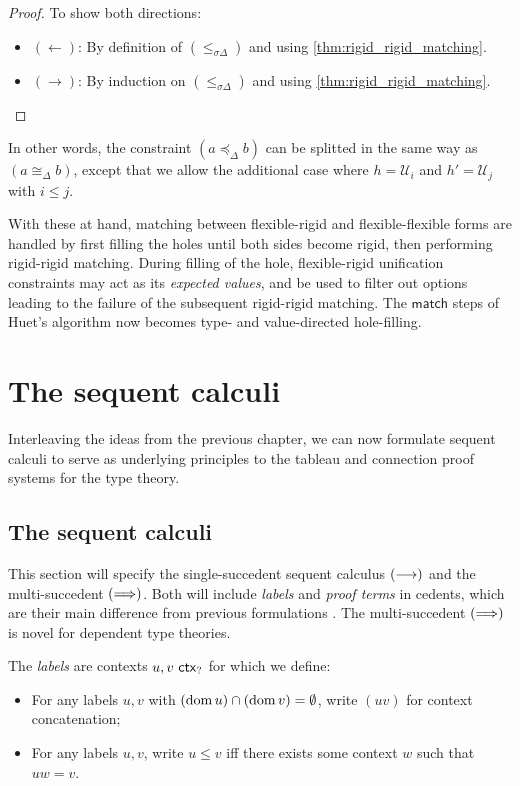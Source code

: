 \documentclass[twoside]{report}
\begin{document}
\begin{proof}
    To show both directions:
    \begin{itemize}[noitemsep]
        \item $(\leftarrow)$: By definition of $(\leq_{\sigma \Delta})$ and using \cref{thm:rigid_rigid_matching}.
        \item $(\rightarrow)$: By induction on $(\leq_{\sigma \Delta})$ and using \cref{thm:rigid_rigid_matching}. \qedhere
    \end{itemize}
\end{proof}

In other words, the constraint $(a \preceq_\Delta b)$ can be splitted in the same way as $(a \cong_\Delta b)$, except that we allow the additional case where $h = \mathcal U_i$ and $h' = \mathcal U_j$ with $i \leq j$.

With these at hand, matching between flexible-rigid and flexible-flexible forms are handled by first filling the holes until both sides become rigid, then performing rigid-rigid matching. During filling of the hole, flexible-rigid unification constraints may act as its \emph{expected values}, and be used to filter out options leading to the failure of the subsequent rigid-rigid matching. The $\mathsf{match}$ steps of Huet's algorithm now becomes type- and value-directed hole-filling.

\chapter{The sequent calculi}
\label{sec:sequent_calculi}

Interleaving the ideas from the previous chapter, we can now formulate sequent calculi to serve as underlying principles to the tableau and connection proof systems for the type theory.

\section{The sequent calculi}
\label{sec:sequent_calculi_spec}

This section will specify the single-succedent sequent calculus $(\longrightarrow)$ and the multi-succedent $(\Longrightarrow)$. Both will include \emph{labels} and \emph{proof terms} in cedents, which are their main difference from previous formulations \cite{pym1990proofs}. The multi-succedent $(\Longrightarrow)$ is novel for dependent type theories.

\begin{definition}[Labels]
    \label{def:labels}
    The \emph{labels} are contexts $u, v \ \mathsf{ctx}_{?}$ for which we define:
    \begin{itemize}[noitemsep]
        \item For any labels $u, v$ with $(\operatorname{dom} u) \cap (\operatorname{dom} v) = \emptyset$, write $(uv)$ for context concatenation;
        \item For any labels $u, v$, write $u \leq v$ iff there exists some context $w$ such that $uw = v$.
    \end{itemize}
\end{definition}
\end{document}
